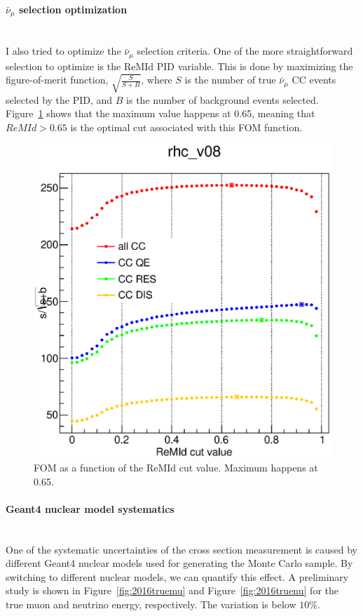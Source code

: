 \documentclass[12pt,a4paper,final]{iopart}
\begin{document}
\paragraph{\textbf{$\bar{\nu}_\mu$ selection optimization}}\hspace*{\fill}\\
I also tried to optimize the $\bar{\nu}_\mu$ selection criteria. One of the more straightforward selection to optimize is the ReMId PID variable. This is done by maximizing the figure-of-merit function, $\sqrt{\frac{S}{S+B}}$, where $S$ is the number of true $\bar{\nu}_\mu$ CC events selected by the PID, and $B$ is the number of background events selected. Figure~\ref{fig:2016rhcremid} shows that the maximum value happens at 0.65, meaning that $ReMId>0.65$ is the optimal cut associated with this FOM function.

\begin{figure}
  \centering
  \includegraphics[width=.6\textwidth]{figures/2016/rhc_v08_remid.eps}
  \caption{FOM as a function of the ReMId cut value. Maximum happens at 0.65.}
  \label{fig:2016rhcremid}
\end{figure}

\paragraph{\textbf{Geant4 nuclear model systematics}}\hspace*{\fill}\\
One of the systematic uncertainties of the cross section measurement is caused by different Geant4 nuclear models used for generating the Monte Carlo sample. By switching to different nuclear models, we can quantify this effect. A preliminary study is shown in Figure~\ref{fig:2016truemu} and Figure~\ref{fig:2016truenu} for the true muon and neutrino energy, respectively. The variation is below $10\%$.
\end{document}
